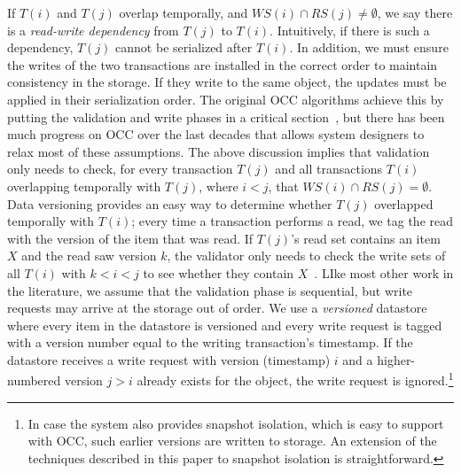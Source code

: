 If $T(i)$ and $T(j)$ overlap temporally, and $WS(i) \cap RS(j) \neq \emptyset$, we say there is a \emph{read-write dependency} from $T(j)$ to $T(i)$. Intuitively, if there is such a dependency, $T(j)$ cannot be serialized after $T(i)$. In addition, we must ensure the writes of the two transactions are installed in the correct order to maintain consistency in the storage. If they write to the same object, the updates must be applied in their serialization order. The original OCC algorithms achieve this by putting the validation and write phases in a critical section~\cite{kung81tods}, but there has been much progress on OCC over the last decades that allows system designers to relax most of these assumptions. 
The above discussion implies that validation only needs to check, for every transaction $T(j)$ and all transactions $T(i)$ overlapping temporally with $T(j)$, where $i<j$, that $WS(i) \cap RS(j) = \emptyset$. Data versioning provides an easy way to determine whether $T(j)$ overlapped temporally with $T(i)$; every time a transaction performs a read, we tag the read with the version of the item that was read. If $T(j)$'s read set contains an item $X$ and the read saw version $k$, the validator only needs to check the write sets of all $T(i)$ with $k < i < j$ to see whether they contain $X$~\cite{ding2015centiman}.
LIke most other work in the literature, we assume that 
the validation phase is sequential, but 
write requests may arrive at the storage out of order. We use a \emph{versioned} datastore where every item in the datastore is versioned and every write request is tagged with a version number equal to the writing transaction's timestamp. If the datastore receives a write request with version (timestamp) $i$ and a higher-numbered version $j > i$ already exists for the object, the write request is ignored.\footnote{In case the system also provides snapshot isolation, which is easy to support with OCC, such earlier versions are written to storage. An extension of the techniques described in this paper to snapshot isolation is straightforward.} 

